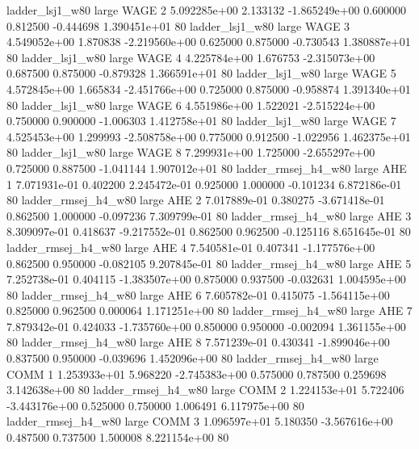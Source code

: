     ladder_lsj1_w80      large     WAGE                 2 5.092285e+00      2.133132 -1.865249e+00 0.600000 0.812500      -0.444698 1.390451e+01 80
    ladder_lsj1_w80      large     WAGE                 3 4.549052e+00      1.870838 -2.219560e+00 0.625000 0.875000      -0.730543 1.380887e+01 80
    ladder_lsj1_w80      large     WAGE                 4 4.225784e+00      1.676753 -2.315073e+00 0.687500 0.875000      -0.879328 1.366591e+01 80
    ladder_lsj1_w80      large     WAGE                 5 4.572845e+00      1.665834 -2.451766e+00 0.725000 0.875000      -0.958874 1.391340e+01 80
    ladder_lsj1_w80      large     WAGE                 6 4.551986e+00      1.522021 -2.515224e+00 0.750000 0.900000      -1.006303 1.412758e+01 80
    ladder_lsj1_w80      large     WAGE                 7 4.525453e+00      1.299993 -2.508758e+00 0.775000 0.912500      -1.022956 1.462375e+01 80
    ladder_lsj1_w80      large     WAGE                 8 7.299931e+00      1.725000 -2.655297e+00 0.725000 0.887500      -1.041144 1.907012e+01 80
ladder_rmsej_h4_w80      large      AHE                 1 7.071931e-01      0.402200  2.245472e-01 0.925000 1.000000      -0.101234 6.872186e-01 80
ladder_rmsej_h4_w80      large      AHE                 2 7.017889e-01      0.380275 -3.671418e-01 0.862500 1.000000      -0.097236 7.309799e-01 80
ladder_rmsej_h4_w80      large      AHE                 3 8.309097e-01      0.418637 -9.217552e-01 0.862500 0.962500      -0.125116 8.651645e-01 80
ladder_rmsej_h4_w80      large      AHE                 4 7.540581e-01      0.407341 -1.177576e+00 0.862500 0.950000      -0.082105 9.207845e-01 80
ladder_rmsej_h4_w80      large      AHE                 5 7.252738e-01      0.404115 -1.383507e+00 0.875000 0.937500      -0.032631 1.004595e+00 80
ladder_rmsej_h4_w80      large      AHE                 6 7.605782e-01      0.415075 -1.564115e+00 0.825000 0.962500       0.000064 1.171251e+00 80
ladder_rmsej_h4_w80      large      AHE                 7 7.879342e-01      0.424033 -1.735760e+00 0.850000 0.950000      -0.002094 1.361155e+00 80
ladder_rmsej_h4_w80      large      AHE                 8 7.571239e-01      0.430341 -1.899046e+00 0.837500 0.950000      -0.039696 1.452096e+00 80
ladder_rmsej_h4_w80      large     COMM                 1 1.253933e+01      5.968220 -2.745383e+00 0.575000 0.787500       0.259698 3.142638e+00 80
ladder_rmsej_h4_w80      large     COMM                 2 1.224153e+01      5.722406 -3.443176e+00 0.525000 0.750000       1.006491 6.117975e+00 80
ladder_rmsej_h4_w80      large     COMM                 3 1.096597e+01      5.180350 -3.567616e+00 0.487500 0.737500       1.500008 8.221154e+00 80
